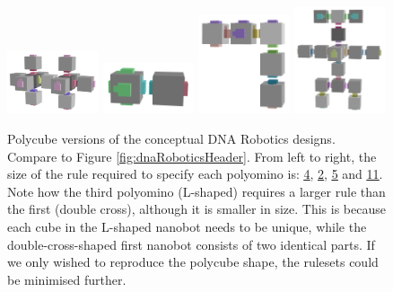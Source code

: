 \begin{figure}
    \centering\includegraphics[align=c,width=0.24\textwidth]{figures/dnaRoboticPolycubes/doubleplus.png}\hfill
    \centering\includegraphics[align=c,width=0.24\textwidth]{figures/dnaRoboticPolycubes/swimmer.png}\hfill
    \centering\includegraphics[align=c,width=0.24\textwidth]{figures/dnaRoboticPolycubes/L.png}\hfill
    \centering\includegraphics[align=c,width=0.24\textwidth]{figures/dnaRoboticPolycubes/robot.png}
\caption{Polycube versions of the conceptual DNA Robotics designs. Compare to Figure \ref{fig:dnaRoboticsHeader}. From left to right, the size of the rule required to specify each polyomino is: \href{https://akodiat.github.io/polycubes/view?hexRule=040890040707840c00000000888a00000000101400000000}{\underline{4}}, \href{https://akodiat.github.io/polycubes/view?hexRule=0a040b0b080a840e00000000}{\underline{2}}, \href{https://akodiat.github.io/polycubes/view?hexRule=06000c0b00001284000b080a0090140b00000000188c0000000014980000}{\underline{5}} and \href{https://akodiat.github.io/polycubes/view?hexRule=0406008800008400240000008c0800000000903400000000980c2f2f10129c1a0000000094000000002214141c000000000028a40000ac3200000000b43000000000}{\underline{11}}. Note how the third polyomino (L-shaped) requires a larger rule than the first (double cross), although it is smaller in size. This is because each cube in the L-shaped nanobot needs to be unique, while the double-cross-shaped first nanobot consists of two identical parts. If we only wished to reproduce the polycube shape, the rulesets could be minimised further.}
\label{fig:dnaRoboticPolycubes}\end{figure}

